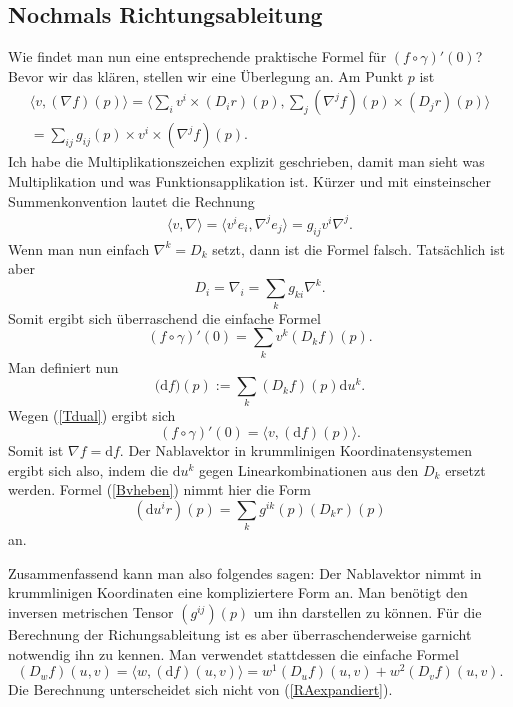 \documentclass[a4paper,12pt,fleqn]{article}
\begin{document}
\subsection{Nochmals Richtungsableitung}
Wie findet man nun eine entsprechende praktische Formel für
\((f\circ\gamma)'(0)\)? Bevor wir das klären, stellen wir eine
Überlegung an. Am Punkt \(p\) ist
\begin{gather*}
\langle v,(\nabla f)(p)\rangle
= \langle\sum_i v^i\times(D_i r)(p),\sum_j (\nabla^j f)(p)\times(D_j r)(p)\rangle\\
= \sum_{ij} g_{ij}(p)\times v^i\times (\nabla^j f)(p).
\end{gather*}
Ich habe die Multiplikationszeichen explizit geschrieben, damit man
sieht was Multiplikation und was Funktionsapplikation ist.
Kürzer und mit einsteinscher Summenkonvention lautet die Rechnung
\begin{gather*}
\langle v,\nabla\rangle = \langle v^i e_i,\nabla^j e_j\rangle
= g_{ij}v^i\nabla^j.
\end{gather*}
Wenn man nun einfach \(\nabla^k=D_k\) setzt, dann ist die Formel
falsch. Tatsächlich ist aber
\begin{equation}
D_i = \nabla_i = \sum_k g_{ki}\nabla^k.
\end{equation}
Somit ergibt sich überraschend die einfache Formel
\begin{equation}
(f\circ\gamma)'(0) = \sum_k v^k (D_k f)(p).
\end{equation}
Man definiert nun
\begin{equation}
\mathrm (\mathrm df)(p):=\sum_k (D_k f)(p)\mathrm du^k.
\end{equation}
Wegen (\ref{Tdual}) ergibt sich
\begin{equation}
(f\circ\gamma)'(0) = \langle v,(\mathrm df)(p)\rangle.
\end{equation}
Somit ist \(\nabla f=\mathrm df\). Der Nablavektor in krummlinigen
Koordinatensystemen ergibt sich also, indem die \(\mathrm du^k\)
gegen Linearkombinationen aus den \(D_k\) ersetzt werden.
Formel (\ref{Bvheben}) nimmt hier die Form
\begin{equation}
(\mathrm du^i r)(p) = \sum_{k}g^{ik}(p)(D_k r)(p)
\end{equation}
an.

Zusammenfassend kann man also folgendes sagen: Der Nablavektor
nimmt in krummlinigen Koordinaten eine kompliziertere Form an.
Man benötigt den inversen metrischen Tensor \((g^{ij})(p)\) um
ihn darstellen zu können. Für die Berechnung der Richungsableitung
ist es aber überraschenderweise garnicht notwendig ihn zu kennen.
Man verwendet stattdessen die einfache Formel
\begin{equation}
(D_w f)(u,v) = \langle w,(\mathrm df)(u,v)\rangle
= w^1 (D_u f)(u,v)+w^2 (D_v f)(u,v).
\end{equation}
Die Berechnung unterscheidet sich nicht von (\ref{RAexpandiert}).
\end{document}
